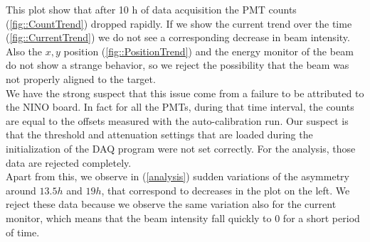 \begin{figure}[hbtp]
\centering
{}
\end{figure}

This plot show that after 10 h of data acquisition the PMT counts (\ref{fig::CountTrend}) dropped rapidly. If we show the current trend over the time (\ref{fig::CurrentTrend}) we do not see a corresponding decrease in beam intensity. Also the $x,y$ position (\ref{fig::PositionTrend}) and the energy monitor of the beam do not show a strange behavior, so we reject the possibility that the beam was not properly aligned to the target. \\
We have the strong suspect that this issue come from a failure to be attributed to the NINO board. In fact for all the PMTs, during that time interval, the  counts are equal to the offsets measured with the auto-calibration run. Our suspect is that the threshold and attenuation settings that are loaded during the initialization of the DAQ program were not set correctly. For the analysis, those data are rejected completely.\\
Apart from this, we observe in (\ref{analysis}) sudden variations of the asymmetry around $13.5 h$ and $19 h$, that correspond to decreases in the plot on the left. We reject these data because we observe the same variation also for the current monitor, which means that the beam intensity fall quickly to $0$ for a short period of time. 

